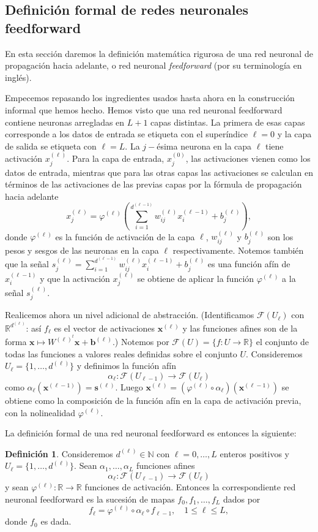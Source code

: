 \documentclass[12pt, a4paper]{amsbook}
\newcommand{\R}{{\mathbb R}}
\newcommand{\N}{{\mathbb N}}
\newcommand{\F}{{\mathcal F}}
\newcommand{\sbf}{{\mathbf s}}
\newcommand{\xx}{{\mathbf x}}
\newcommand{\bb}{{\mathbf b}}
\theoremstyle{remark}
\theoremstyle{definition}
\newtheorem{defi}[teo]{Definici\'on}
\numberwithin{section}{chapter}
\numberwithin{subsection}{section}
\numberwithin{equation}{section}
\numberwithin{figure}{chapter}
\begin{document}
\subsection{Definición formal de redes neuronales feedforward}

En esta sección daremos la definición matemática rigurosa de una red neuronal de propagación hacia adelante, o red neuronal {\em feedforward} (por su terminología en inglés).

Empecemos repasando los ingredientes usados hasta ahora en la construcción informal que hemos hecho. Hemos visto que una red neuronal feedforward contiene neuronas arregladas en $L+1$ capas distintas. La primera de esas capas corresponde a los datos de entrada se etiqueta con el superíndice $\ell=0$ y la capa de salida se etiqueta con $\ell=L$. La $j-$ésima neurona en la capa $\ell$ tiene activación $x_j^{(\ell)}$. Para la capa de entrada, $x_j^{(0)}$, las activaciones vienen como los datos de entrada, mientras que para las otras capas las activaciones se calculan en términos de las activaciones de las previas capas por la fórmula de propagación hacia adelante
$$
x_j^{(\ell)} = \varphi^{(\ell)}\left(\sum_{i=1}^{d^{(\ell-1)}} w_{ij}^{(\ell)} x_i^{(\ell-1)} + b_j^{(\ell)}\right),
$$
donde $\varphi^{(\ell)}$ es la función de activación de la capa $\ell$, $w_{ij}^{(\ell)}$ y $b_j^{(\ell)}$ son los pesos y sesgos de las neuronas en la capa $\ell$ respectivamente. Notemos también que la señal $s_j^{(\ell)} =\sum_{i=1}^{d^{(\ell-1)}} w_{ij}^{(\ell)} x_i^{(\ell-1)} + b_j^{(\ell)}$ es una función afín de $x_i^{(\ell-1)}$ y que la activación $x_j^{(\ell)}$ se obtiene de aplicar la función $\varphi^{(\ell)}$ a la señal $s_j^{(\ell)}$.

Realicemos ahora un nivel adicional de abstracción. (Identificamos $\F(U_\ell)$ con $\R^{d^{(\ell)}}$: así $f_\ell$ es el vector de activaciones $\xx^{(\ell)}$ y las funciones afines son de la forma $\xx\mapsto W^{(\ell)^t}\xx+ \bb^{(\ell)}$.) Notemos por $\F(U) = \{f\colon U\to\R\}$ el conjunto de todas las funciones a valores reales definidas sobre el conjunto $U$. Consideremos $U_\ell = \{1,\dots, d^{(\ell)}\}$ y definimos la función afín
$$
\alpha_\ell\colon \F(U_{\ell-1})\to \F(U_\ell)
$$
como $\alpha_\ell(\xx^{(\ell-1)}) = \sbf^{(\ell)}$. Luego $\xx^{(\ell)} = (\varphi^{(\ell)}\circ \alpha_\ell)(\xx^{(\ell-1)})$ se obtiene como la composición de la función afín en la capa de activación previa, con la nolinealidad $\varphi^{(\ell)}$.

La definición formal de una red neuronal feedforward es entonces la siguiente:
\begin{defi}
Consideremos $d^{(\ell)}\in\N$ con $\ell=0,\dots,L$ enteros positivos y $U_\ell =  \{1,\dots, d^{(\ell)}\}$. Sean $\alpha_1,\dots,\alpha_L$ funciones afines
$$
\alpha_\ell\colon \F(U_{\ell-1})\to \F(U_\ell)
$$
y sean $\varphi^{(\ell)}\colon \R\to\R$ funciones de activación. Entonces la correspondiente red neuronal feedforward es la sucesión de mapas $f_0, f_1,\dots, f_L$ dados por
$$
f_\ell = \varphi^{(\ell)}\circ\alpha_\ell\circ f_{\ell-1},\quad 1\le \ell\le L,
$$
donde $f_0$ es dada.
\end{defi}
\end{document}
